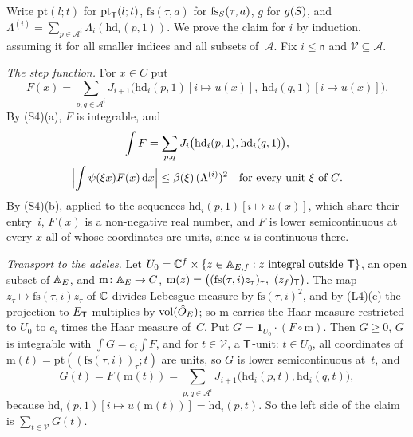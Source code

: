 \documentclass[11pt,a4paper]{article}
\makeatletter
\theoremstyle{plainx}
\theoremstyle{uprightx}
\renewenvironment{proof}[1][Proof]{\par\pushQED{\qed}\normalfont\topsep0pt\partopsep0pt
  \trivlist\item[\hskip\labelsep\itshape #1.]\ignorespaces}{\popQED\endtrivlist\@endpefalse}
\newcommand{\dd}{\mathrm{d}}
\newcommand{\Inp}[1]{\textup{(#1)}}
\makeatother
\begin{document}
\begin{proof}[Proof of Theorem C]
Write $\mathrm{pt}(l;t)$ for $\mathrm{pt}_{\mathsf{T}}(l;t)$, $\mathrm{fs}(\tau,a)$ for $\mathrm{fs}_{S}(\tau,a)$, $g$ for $g(S)$, and
$\Lambda^{(i)}=\sum_{p\in\mathcal{A}^{i}}\Lambda_i(\mathrm{hd}_i(p,1))$. We prove the claim for $i$ by induction,
assuming it for all smaller indices and all subsets of~$\mathcal{A}$. Fix $i\le\mathsf{n}$ and
$\mathcal{V}\subseteq\mathcal{A}$.

\emph{The step function.} For $x\in C$ put
\[F(x)=\sum_{p,q\in\mathcal{A}^{i}}J_{i+1}\bigl(\mathrm{hd}_i(p,1)[i\mapsto u(x)],\ \mathrm{hd}_i(q,1)[i\mapsto u(x)]\bigr).\]
By \Inp{S4}(a), $F$ is integrable, and
\begin{gather*}\int F=\sum_{p,q}J_i\bigl(\mathrm{hd}_i(p,1),\mathrm{hd}_i(q,1)\bigr),\\
\Bigl|\int\psi(\xi x)F(x)\,\dd x\Bigr|\le\beta(\xi)\,(\Lambda^{(i)})^{2}\quad\text{for every unit $\xi$ of~$C$.}\end{gather*}
By \Inp{S4}(b), applied to
the sequences $\mathrm{hd}_i(p,1)[i\mapsto u(x)]$, which share their entry~$i$, $F(x)$ is a non-negative real number,
and $F$ is lower semicontinuous at every $x$ all of whose coordinates are units, since $u$ is continuous there.

\emph{Transport to the adeles.} Let $U_0=\mathbb{C}^{f}\times\{z\in\mathbb{A}_{E,f}:z\text{ integral outside }\mathsf{T}\}$, an open subset of
$\mathbb{A}_{E}$, and $\mathrm{m}\colon\mathbb{A}_{E}\to C$, $\mathrm{m}(z)=\bigl((\mathrm{fs}(\tau,i)z_\tau)_\tau,\ (z_f)_{\sT}\bigr)$. The
map $z_\tau\mapsto\mathrm{fs}(\tau,i)z_\tau$ of $\mathbb{C}$ divides Lebesgue measure by $\mathrm{fs}(\tau,i)^{2}$, and by
\Inp{L4}(c) the projection to $E_{\mathsf{T}}$ multiplies by $\operatorname{vol}(\hat O_{E})$; so $\mathrm{m}$ carries the Haar measure
restricted to $U_0$ to $c_i$ times the Haar measure of~$C$. Put $G=\mathbf{1}_{U_0}\cdot(F\circ\mathrm{m})$. Then
$G\ge0$, $G$ is integrable with $\int G=c_i\int F$, and for $t\in\mathcal{V}$, a $\mathsf{T}$-unit: $t\in U_0$, all
coordinates of $\mathrm{m}(t)=\mathrm{pt}((\mathrm{fs}(\tau,i))_\tau;t)$ are units, so $G$ is lower semicontinuous
at~$t$, and
\[G(t)=F(\mathrm{m}(t))=\sum_{p,q\in\mathcal{A}^{i}}J_{i+1}\bigl(\mathrm{hd}_i(p,t),\mathrm{hd}_i(q,t)\bigr),\]
because $\mathrm{hd}_i(p,1)[i\mapsto u(\mathrm{m}(t))]=\mathrm{hd}_i(p,t)$. So the left side of the claim is
$\sum_{t\in\mathcal{V}}G(t)$.


\end{proof}
\end{document}
